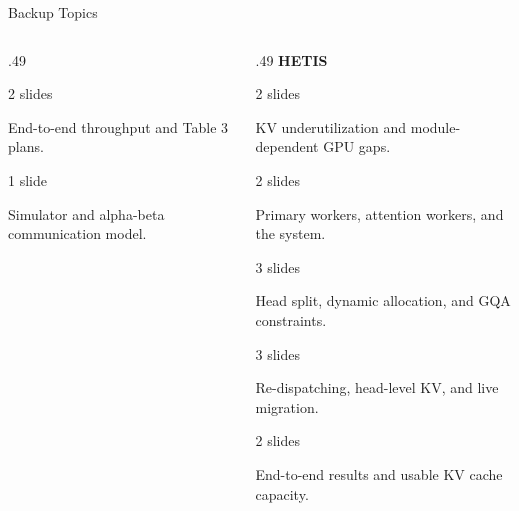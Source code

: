 \begin{frame}[t,label=backup_index]{Backup Topics}
\begin{columns}[T,onlytextwidth]
\begin{column}{.49\textwidth}
      \vspace{.07cm}
      {\footnotesize{}\hfill{\scriptsize\color{Muted}2 slides}\par}
      {\scriptsize\color{Muted}End-to-end throughput and Table 3 plans.}\par
      \vspace{.07cm}
      {\footnotesize{}\hfill{\scriptsize\color{Muted}1 slide}\par}
      {\scriptsize\color{Muted}Simulator and alpha-beta communication model.}\par
    \end{column}
    \begin{column}{.49\textwidth}
      {\scriptsize\bfseries\color{Accent}HETIS}\par
      \vspace{.10cm}
      {\footnotesize{}\hfill{\scriptsize\color{Muted}2 slides}\par}
      {\scriptsize\color{Muted}KV underutilization and module-dependent GPU gaps.}\par
      \vspace{.07cm}
      {\footnotesize{}\hfill{\scriptsize\color{Muted}2 slides}\par}
      {\scriptsize\color{Muted}Primary workers, attention workers, and the system.}\par
      \vspace{.07cm}
      {\footnotesize{}\hfill{\scriptsize\color{Muted}3 slides}\par}
      {\scriptsize\color{Muted}Head split, dynamic allocation, and GQA constraints.}\par
      \vspace{.07cm}
      {\footnotesize{}\hfill{\scriptsize\color{Muted}3 slides}\par}
      {\scriptsize\color{Muted}Re-dispatching, head-level KV, and live migration.}\par
      \vspace{.07cm}
      {\footnotesize{}\hfill{\scriptsize\color{Muted}2 slides}\par}
      {\scriptsize\color{Muted}End-to-end results and usable KV cache capacity.}\par

\end{column}
\end{columns}
\end{frame}
